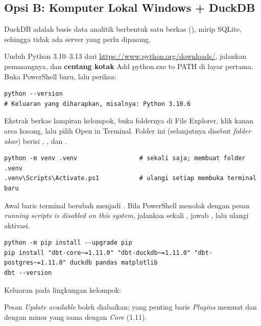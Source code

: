 \subsection{Opsi B: Komputer Lokal Windows + DuckDB}\label{sec:opsiB}
DuckDB adalah basis data analitik berbentuk satu berkas (), mirip SQLite, sehingga tidak ada server yang perlu dipasang.

 Unduh Python 3.10--3.13 dari \url{https://www.python.org/downloads/}, jalankan pemasangnya, dan \textbf{centang kotak} \textsf{Add python.exe to PATH} di layar pertama. Buka PowerShell baru, lalu periksa:
\begin{lstlisting}[style=term]
python --version
# Keluaran yang diharapkan, misalnya: Python 3.10.6
\end{lstlisting}

 Ekstrak berkas lampiran kelompok, buka foldernya di File Explorer, klik kanan area kosong, lalu pilih \textsf{Open in Terminal}. Folder ini (selanjutnya disebut \emph{folder akar}) berisi , , dan .

\begin{lstlisting}[style=term, caption={Membuat dan mengaktifkan venv (PowerShell).}, label={lst:venv}]
python -m venv .venv                 # sekali saja; membuat folder .venv
.venv\Scripts\Activate.ps1           # ulangi setiap membuka terminal baru
\end{lstlisting}

\begin{cekberhasil}
Awal baris terminal berubah menjadi . Bila PowerShell menolak dengan pesan \textit{running scripts is disabled on this system}, jalankan sekali , jawab , lalu ulangi aktivasi.
\end{cekberhasil}

\begin{lstlisting}[style=term, caption={Instalasi dbt dengan versi terkunci.}, label={lst:pip}]
python -m pip install --upgrade pip
pip install "dbt-core~=1.11.0" "dbt-duckdb~=1.11.0" "dbt-postgres~=1.11.0" duckdb pandas matplotlib
dbt --version
\end{lstlisting}
Keluaran  pada lingkungan kelompok:

Pesan \textit{Update available} boleh diabaikan; yang penting baris \textit{Plugins} memuat  dan  dengan minor yang sama dengan \textit{Core} (1.11).

